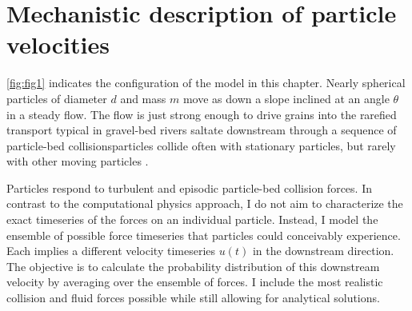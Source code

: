 \section{Mechanistic description of particle velocities}
\label{sec:langmodel}

\DIFdelbegin {}\DIFdelend \DIFaddbegin {}\DIFaddend \ref{fig:fig1} indicates the configuration of the model in this chapter.
Nearly spherical \DIFdelbegin {}\DIFdelend particles of diameter $d$ and mass $m$ move as \DIFdelbegin {}\DIFdelend \DIFaddbegin {}\DIFaddend down a slope inclined at an angle $\theta$ in a steady \DIFdelbegin {}\DIFdelend flow.
The flow is just strong enough to drive grains into the rarefied transport typical in \DIFaddbegin {}\DIFaddend gravel-bed rivers \DIFdelbegin {}\DIFdelend \DIFaddbegin {}\DIFaddend saltate downstream through a sequence of particle-bed collisions\DIFdelbegin {}\DIFdelend \DIFaddbegin {}\DIFaddend particles collide often with stationary particles, but rarely with other moving particles \DIFaddbegin {}\DIFaddend .

Particles respond to turbulent \DIFdelbegin {}\DIFdelend \DIFaddbegin {}\DIFaddend and episodic particle-bed collision forces. In contrast to the computational physics approach, I do not aim to characterize the exact timeseries of the forces on an individual particle. Instead, I model the ensemble of possible force timeseries that particles could conceivably experience. Each \DIFdelbegin {}\DIFdelend \DIFaddbegin {}\DIFaddend implies a different \DIFdelbegin {}\DIFdelend velocity timeseries $u(t)$ in the downstream direction.
The objective is to calculate the probability distribution \DIFdelbegin {}\DIFdelend \DIFaddbegin {}\DIFaddend of this downstream velocity by averaging over the ensemble of forces.
\DIFaddbegin {}\DIFaddend I include the most realistic \DIFdelbegin {}\DIFdelend \DIFaddbegin {}\DIFaddend collision and fluid forces possible while still allowing for analytical solutions.

